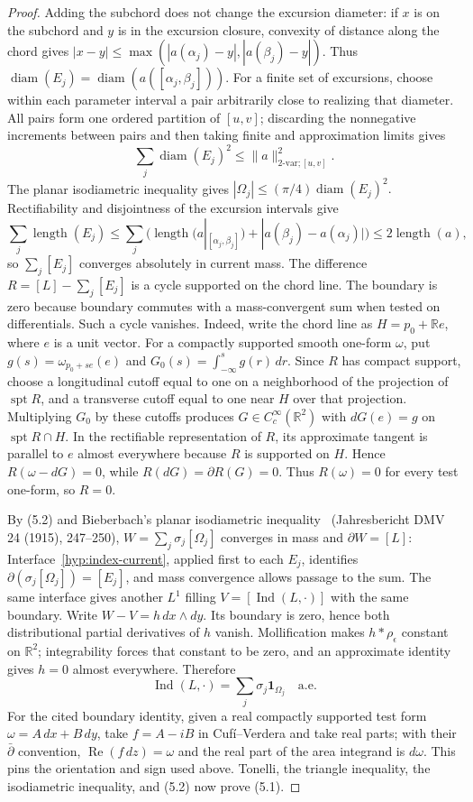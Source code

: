 \documentclass[11pt]{article}
\theoremstyle{definition}
\theoremstyle{remark}
\newcommand{\R}{\mathbb R}
\newcommand{\Ind}{\operatorname{Ind}}
\newcommand{\diam}{\operatorname{diam}}
\begin{document}
\begin{proof}
Adding the subchord does not change the excursion diameter: if $x$ is on the
subchord and $y$ is in the excursion closure, convexity of distance along
the chord gives $|x-y|\leq\max(|a(\alpha_j)-y|,|a(\beta_j)-y|)$.  Thus
$\diam(E_j)=\diam(a([\alpha_j,\beta_j]))$.  For a finite set of excursions,
choose within each parameter interval a pair arbitrarily close to realizing
that diameter.  All pairs form one ordered partition of $[u,v]$; discarding
the nonnegative increments between pairs and then taking finite and
approximation limits gives
\[
 \sum_j\diam(E_j)^2
 \leq\|a\|_{2\text{-var};[u,v]}^2.                       \tag{5.2}
\]
The planar isodiametric inequality gives
\(
 |\Omega_j|\leq(\pi/4)\diam(E_j)^2.
\)
Rectifiability and disjointness of the excursion intervals give
\[
 \sum_j\operatorname{length}(E_j)
 \leq\sum_j\bigl(\operatorname{length}(a|_{[\alpha_j,\beta_j]})
       +|a(\beta_j)-a(\alpha_j)|\bigr)
 \leq2\operatorname{length}(a),
\]
so $\sum_j[E_j]$ converges absolutely in current mass.
The difference $R=[L]-\sum_j[E_j]$ is a cycle supported on the chord line.
The boundary is zero because boundary commutes with a mass-convergent sum
when tested on differentials.
Such a cycle vanishes.  Indeed, write the chord line as $H=p_0+\R e$, where
$e$ is a unit vector.  For a compactly supported smooth one-form $\omega$,
put $g(s)=\omega_{p_0+se}(e)$ and
$G_0(s)=\int_{-\infty}^s g(r)\,dr$.  Since $R$ has compact support, choose a
longitudinal cutoff equal to one on a neighborhood of the projection of
$\operatorname{spt}R$, and a transverse cutoff equal to one near $H$ over
that projection.  Multiplying $G_0$ by these cutoffs produces
$G\in C_c^\infty(\R^2)$ with $dG(e)=g$ on
$\operatorname{spt}R\cap H$.  In the rectifiable representation of $R$, its
approximate tangent is parallel to $e$ almost everywhere because $R$ is
supported on $H$.  Hence $R(\omega-dG)=0$, while
$R(dG)=\partial R(G)=0$.  Thus $R(\omega)=0$ for every test one-form, so
$R=0$.

By (5.2) and Bieberbach's planar isodiametric inequality~\cite{Bieberbach}
(Jahresbericht DMV 24 (1915), 247--250),
$W=\sum_j\sigma_j[\Omega_j]$ converges in mass and
$\partial W=[L]$: Interface~\ref{hyp:index-current}, applied first to each
$E_j$, identifies $\partial(\sigma_j[\Omega_j])=[E_j]$, and mass convergence
allows passage to the sum.  The same interface gives another
$L^1$ filling $V=[\Ind(L,\cdot)]$ with the same boundary.  Write
$W-V=h\,dx\wedge dy$.  Its boundary is zero, hence both distributional
partial derivatives of $h$ vanish.  Mollification makes $h*\rho_\epsilon$
constant on $\R^2$; integrability forces that constant to be zero, and an
approximate identity gives $h=0$ almost everywhere.  Therefore
\[
 \Ind(L,\cdot)=\sum_j\sigma_j\mathbf1_{\Omega_j}\quad\text{a.e.}
\]
For the cited boundary identity, given a real compactly supported test form
$\omega=A\,dx+B\,dy$, take $f=A-iB$ in Cuf\'i--Verdera and take real parts;
with their $\bar\partial$ convention,
$\operatorname{Re}(f\,dz)=\omega$ and the real part of the area integrand is
$d\omega$.  This pins the orientation and sign used above.
Tonelli, the triangle inequality, the isodiametric inequality, and (5.2)
now prove (5.1).
\end{proof}
\end{document}
